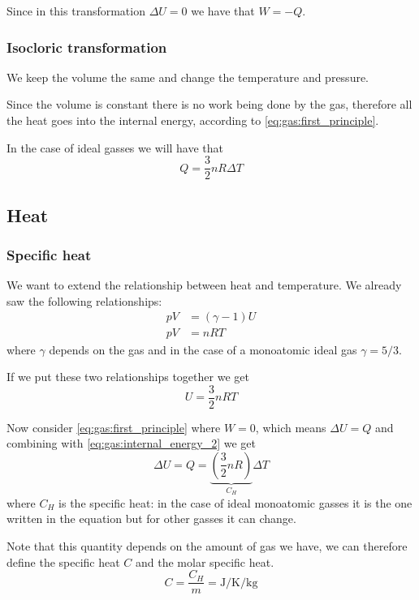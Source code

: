 \documentclass[14pt]{extarticle}
\begin{document}
Since in this transformation $\Delta U = 0$ we have that $W = -Q$.

\subsubsection{Isocloric transformation}

We keep the volume the same and change the temperature and pressure.

Since the volume is constant there is no work being done by the gas, therefore all the heat goes into the internal energy, according to \autoref{eq:gas:first_principle}.

In the case of ideal gasses we will have that
\begin{equation}
    Q = \frac{3}{2}nR\Delta T
\end{equation}

\subsection{Heat}

\subsubsection{Specific heat}

We want to extend the relationship between heat and temperature.
We already saw the following relationships:
\begin{align}
    pV & = (\gamma - 1)U \\
    pV & = nRT
\end{align}
where $\gamma$ depends on the gas and in the case of a monoatomic ideal gas $\gamma = 5/3$.

If we put these two relationships together we get
\begin{equation}
    \label{eq:gas:internal_energy_2}
    U = \frac{3}{2}nRT
\end{equation}

Now consider \autoref{eq:gas:first_principle} where $W = 0$, which means $\Delta U = Q$ and combining with \autoref{eq:gas:internal_energy_2} we get
\begin{equation}
    \Delta U = Q = \underbrace{\left(\frac{3}{2} n R \right)}_{C_H} \Delta T
\end{equation}
where $C_H$ is the specific heat: in the case of ideal monoatomic gasses it is the one written in the equation but for other gasses it can change.

Note that this quantity depends on the amount of gas we have, we can therefore define the specific heat $C$ and the molar specific heat.
\begin{equation}
    C = \frac{C_H}{m} = \si{\joule \per \kelvin \per \kilogram}
\end{equation}
\end{document}
